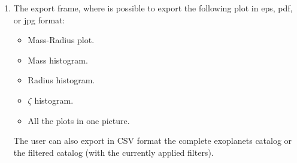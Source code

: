 \documentclass[preprint,12pt]{elsarticle}
\begin{document}
\begin{enumerate}
                \item The export frame, where is possible to export the following plot in eps, pdf, or jpg format:
                \begin{itemize}
                    \item Mass-Radius plot.
                    \item Mass histogram.
                    \item Radius histogram.
                    \item $\zeta$ histogram.
                    \item All the plots in one picture.
                \end{itemize}
            
               The user can also export in CSV format the complete exoplanets catalog or the filtered catalog (with the currently applied filters).
            \end{enumerate}
    
\end{document}
